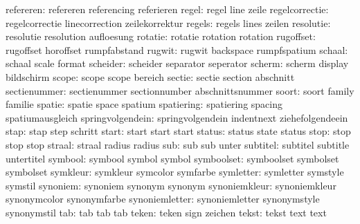            refereren:  refereren            referencing          referieren
               regel:  regel                line                 zeile
      regelcorrectie:  regelcorrectie       linecorrection       zeilekorrektur
              regels:  regels               lines                zeilen
           resolutie:  resolutie            resolution           aufloesung
             rotatie:  rotatie              rotation             rotation
           rugoffset:  rugoffset            horoffset            rumpfabstand
              rugwit:  rugwit               backspace            rumpfspatium
              schaal:  schaal               scale                format
            scheider:  scheider             separator            seperator
              scherm:  scherm               display              bildschirm
               scope:  scope                scope                bereich
              sectie:  sectie               section              abschnitt
        sectienummer:  sectienummer         sectionnumber        abschnittsnummer
               soort:  soort                family               familie
              spatie:  spatie               space                spatium
          spatiering:  spatiering           spacing              spatiumausgleich
    springvolgendein:  springvolgendein     indentnext           ziehefolgendeein
                stap:  stap                 step                 schritt
               start:  start                start                start
              status:  status               state                status
                stop:  stop                 stop                 stop
              straal:  straal               radius               radius
                 sub:  sub                  sub                  unter
            subtitel:  subtitel             subtitle             untertitel
             symbool:  symbool              symbol               symbol
          symboolset:  symboolset           symbolset            symbolset 
            symkleur:  symkleur             symcolor             symfarbe
           symletter:  symletter            symstyle             symstil
            synoniem:  synoniem             synonym              synonym
       synoniemkleur:  synoniemkleur        synonymcolor         synonymfarbe
      synoniemletter:  synoniemletter       synonymstyle         synonymstil
                 tab:  tab                  tab                  tab
               teken:  teken                sign                 zeichen
               tekst:  tekst                text                 text
